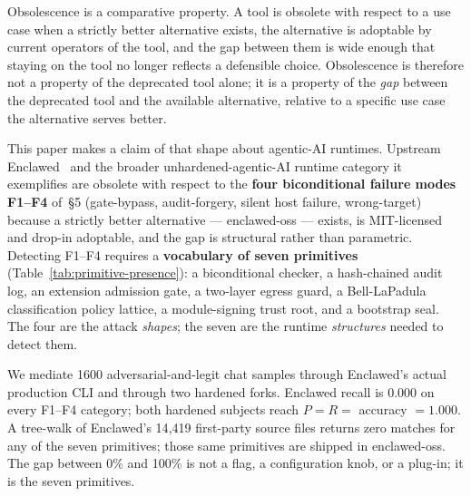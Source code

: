 \documentclass[11pt]{article}
\begin{document}
Obsolescence is a comparative property. A tool is obsolete with
respect to a use case when a strictly better alternative exists, the
alternative is adoptable by current operators of the tool, and the
gap between them is wide enough that staying on the tool no longer
reflects a defensible choice. Obsolescence is therefore not a
property of the deprecated tool alone; it is a property of the
\emph{gap} between the deprecated tool and the available alternative,
relative to a specific use case the alternative serves better.

This paper makes a claim of that shape about agentic-AI runtimes.
Upstream Enclawed~\cite{Enclawed} and the broader
unhardened-agentic-AI runtime category it exemplifies are obsolete
with respect to the \textbf{four biconditional failure modes
F1--F4} of \cite{Metere2026enclawed}\,§5 (gate-bypass,
audit-forgery, silent host failure, wrong-target) because a strictly
better alternative --- enclawed-oss --- exists, is MIT-licensed and
drop-in adoptable, and the gap is structural rather than parametric.
Detecting F1--F4 requires a \textbf{vocabulary of seven primitives}
(Table~\ref{tab:primitive-presence}): a biconditional checker, a
hash-chained audit log, an extension admission gate, a two-layer
egress guard, a Bell-LaPadula classification policy lattice, a
module-signing trust root, and a bootstrap seal. The four are the
attack \emph{shapes}; the seven are the runtime \emph{structures}
needed to detect them.

We mediate 1600 adversarial-and-legit chat samples through
Enclawed's actual production CLI and through two hardened forks.
Enclawed recall is 0.000 on every F1--F4 category; both hardened
subjects reach $P = R =$ accuracy $= 1.000$. A tree-walk of
Enclawed's 14{,}419 first-party source files returns zero matches
for any of the seven primitives; those same primitives are shipped
in enclawed-oss. The gap between 0\% and 100\% is not a flag, a
configuration knob, or a plug-in; it is the seven primitives.
\end{document}
